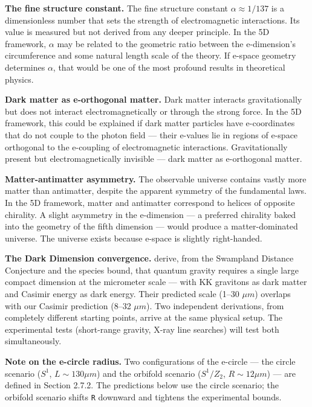 \documentclass[aps,prd,preprint,superscriptaddress,longbibliography,floatfix]{revtex4-2}
\theoremstyle{remark}
\begin{document}
\textbf{The fine structure constant.} The fine structure constant $\alpha \approx 1/137$ is a dimensionless number that sets the strength of electromagnetic interactions. Its value is measured but not derived from any deeper principle. In the 5D framework, $\alpha$ may be related to the geometric ratio between the e-dimension's circumference and some natural length scale of the theory. If e-space geometry determines $\alpha$, that would be one of the most profound results in theoretical physics.

\textbf{Dark matter as e-orthogonal matter.} Dark matter interacts gravitationally but does not interact electromagnetically or through the strong force. In the 5D framework, this could be explained if dark matter particles have e-coordinates that do not couple to the photon field --- their e-values lie in regions of e-space orthogonal to the e-coupling of electromagnetic interactions. Gravitationally present but electromagnetically invisible --- dark matter as e-orthogonal matter.

\textbf{Matter-antimatter asymmetry.} The observable universe contains vastly more matter than antimatter, despite the apparent symmetry of the fundamental laws. In the 5D framework, matter and antimatter correspond to helices of opposite chirality. A slight asymmetry in the e-dimension --- a preferred chirality baked into the geometry of the fifth dimension --- would produce a matter-dominated universe. The universe exists because e-space is slightly right-handed.

\textbf{The Dark Dimension convergence.} \cite{VafaDarkDimension2022} derive, from the Swampland Distance Conjecture and the species bound, that quantum gravity requires a single large compact dimension at the micrometer scale --- with KK gravitons as dark matter and Casimir energy as dark energy. Their predicted scale (1--30 $\mu m$) overlaps with our Casimir prediction (8--32 $\mu m$). Two independent derivations, from completely different starting points, arrive at the same physical setup. The experimental tests (short-range gravity, X-ray line searches) will test both simultaneously.

\textbf{Note on the e-circle radius.} Two configurations of the e-circle --- the circle scenario ($S^{1}$, $L \sim  130 \mu m$) and the orbifold scenario ($S^{1}/Z_{2}$, $R \sim  12 \mu m$) --- are defined in Section 2.7.2. The predictions below use the circle scenario; the orbifold scenario shifts \texttt{R} downward and tightens the experimental bounds.
\end{document}

